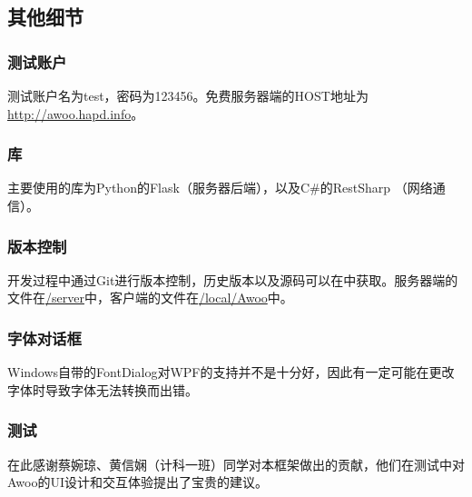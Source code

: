 \documentclass[a4paper,11pt]{article}
\begin{document}
    \subsection{其他细节}
        \subsubsection{测试账户}
            测试账户名为test，密码为123456。免费服务器端的HOST地址为\url{http://awoo.hapd.info}。
        \subsubsection{库}
            主要使用的库为Python的Flask\textsuperscript{\cite{3}}（服务器后端），以及C\#的RestSharp\textsuperscript{\cite{6}} （网络通信）。
        \subsubsection{版本控制}
            开发过程中通过Git进行版本控制，历史版本以及源码可以在\cite{7}中获取。服务器端的文件在\url{/server}中，客户端的文件在\url{/local/Awoo}中。
        \subsubsection{字体对话框}
            Windows自带的FontDialog对WPF的支持并不是十分好，因此有一定可能在更改字体时导致字体无法转换而出错。
        \subsubsection{测试}
            在此感谢蔡婉琼、黄信娴（计科一班）同学对本框架做出的贡献，他们在测试中对Awoo的UI设计和交互体验提出了宝贵的建议。
\end{document}
